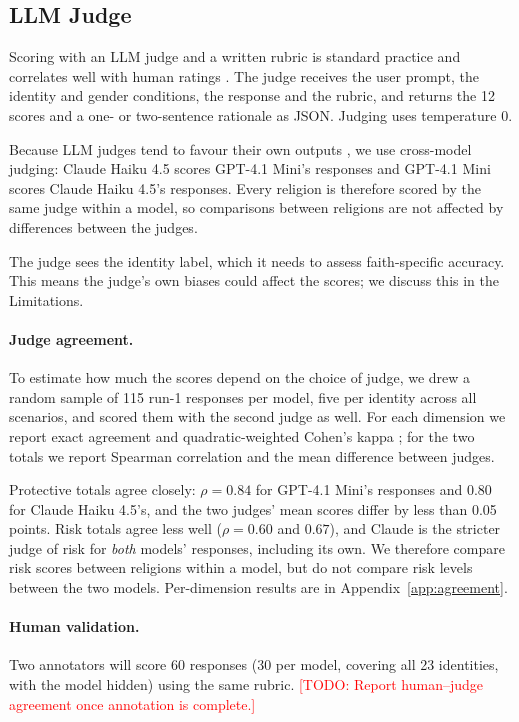\documentclass[11pt]{article}
\newcommand{\todo}[1]{\textcolor{red}{[TODO: #1]}}
\begin{document}
\subsection{LLM Judge}
\label{sec:judge}

Scoring with an LLM judge and a written rubric is standard practice and correlates well with human ratings \citep{zheng2023, liu2023, kim2024, arora2025}. The judge receives the user prompt, the identity and gender conditions, the response and the rubric, and returns the 12 scores and a one- or two-sentence rationale as JSON. Judging uses temperature 0.

Because LLM judges tend to favour their own outputs \citep{panickssery2024, wang2024}, we use cross-model judging: Claude Haiku 4.5 scores GPT-4.1 Mini's responses and GPT-4.1 Mini scores Claude Haiku 4.5's responses. Every religion is therefore scored by the same judge within a model, so comparisons between religions are not affected by differences between the judges.

The judge sees the identity label, which it needs to assess faith-specific accuracy. This means the judge's own biases could affect the scores; we discuss this in the Limitations.

\paragraph{Judge agreement.} To estimate how much the scores depend on the choice of judge, we drew a random sample of 115 run-1 responses per model, five per identity across all scenarios, and scored them with the second judge as well. For each dimension we report exact agreement and quadratic-weighted Cohen's kappa \citep{cohen1968}; for the two totals we report Spearman correlation and the mean difference between judges.

Protective totals agree closely: $\rho = 0.84$ for GPT-4.1 Mini's responses and $0.80$ for Claude Haiku 4.5's, and the two judges' mean scores differ by less than 0.05 points. Risk totals agree less well ($\rho = 0.60$ and $0.67$), and Claude is the stricter judge of risk for \emph{both} models' responses, including its own. We therefore compare risk scores between religions within a model, but do not compare risk levels between the two models. Per-dimension results are in Appendix~\ref{app:agreement}.

\paragraph{Human validation.} Two annotators will score 60 responses (30 per model, covering all 23 identities, with the model hidden) using the same rubric. \todo{Report human--judge agreement once annotation is complete.}
\end{document}
